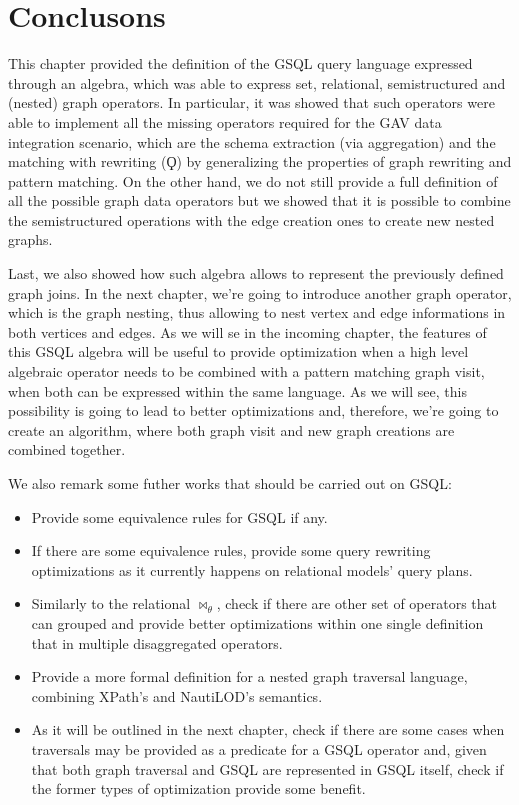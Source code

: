 \section{Conclusons}
This chapter provided the definition of the GSQL query language expressed through an algebra, which was able to express set, relational, semistructured and (nested) graph operators. In particular, it was showed that such operators were able to implement all the missing operators required for the GAV data integration scenario, which are the schema extraction (via aggregation) and the matching with rewriting ($\Qoppa$) by generalizing the properties of graph rewriting and pattern matching. On the other hand, we do not still provide a full definition of all the possible graph data operators but  we showed that it is possible to combine the semistructured operations with the edge creation ones to create new nested graphs. 

Last, we also showed how such algebra allows to represent the previously defined graph joins. In the next chapter, we're going to introduce another graph operator, which is the graph nesting, thus allowing to nest vertex and edge informations in both vertices and edges. As we will se in the incoming chapter, the features of this GSQL algebra will be useful to provide optimization when a high level algebraic operator needs to be combined with a pattern matching graph visit, when both can be expressed within the same language. As we will see, this possibility is going to lead to better optimizations and, therefore, we're going to create an algorithm, where both graph visit and new graph creations are combined together.
\pagebreak


We also remark some futher works that should be carried out on GSQL:
\begin{itemize}
\item Provide some equivalence rules for GSQL if any.
\item If there are some equivalence rules, provide some query rewriting optimizations as it currently happens on relational models' query plans. 
\item Similarly to the relational $\bowtie_\theta$, check if there are other set of operators that can grouped and provide better optimizations within one single definition that in multiple disaggregated operators.
\item Provide a more formal definition for a nested graph traversal language, combining XPath's and NautiLOD's semantics.
\item As it will be outlined in the next chapter, check if there are some cases when traversals may be provided as a predicate for a GSQL operator and, given that both graph traversal and GSQL are represented in GSQL itself, check if the former types of optimization provide some benefit.
\end{itemize} 